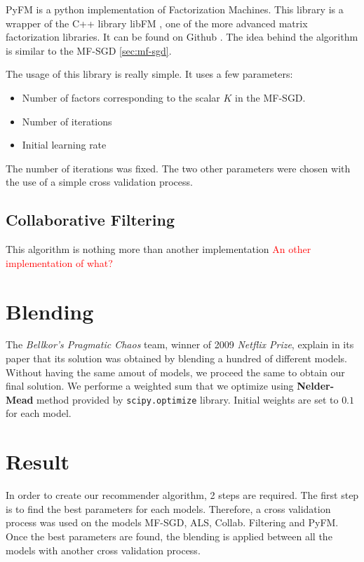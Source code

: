 \documentclass[10pt,conference,compsocconf]{IEEEtran}
\begin{document}
PyFM is a python implementation of Factorization Machines. This library is a wrapper of the C++ library libFM \cite{rendle:tist2012}, one of the more advanced matrix factorization libraries. It can be found on Github \cite{pyfm}. The idea behind the algorithm is similar to the MF-SGD \ref{sec:mf-sgd}. 

The usage of this library is really simple. It uses a few parameters:
\begin{itemize}
 \item Number of factors corresponding to the scalar $K$ in the MF-SGD.
 \item Number of iterations
 \item Initial learning rate
\end{itemize}

The number of iterations was fixed. The two other parameters were chosen with the use of a simple cross validation process.

\subsection{Collaborative Filtering}

This algorithm is nothing more than another implementation \textcolor{red}{An other implementation of what?}

\section{Blending}

The \textit{Bellkor's Pragmatic Chaos} team, winner of 2009 \textit{Netflix Prize}, explain in its paper that its solution was obtained by blending a hundred of different models. \cite{BellKore_netflix} Without having the same amout of models, we proceed the same to obtain our final solution. We performe a weighted sum that we optimize using \textbf{Nelder-Mead} method provided by \texttt{scipy.optimize} library. Initial weights are set to $0.1$ for each model.

\section{Result}

In order to create our recommender algorithm, 2 steps are required. The first step is to find the best parameters for each models. Therefore, a cross validation process was used on the models MF-SGD, ALS, Collab. Filtering and PyFM. Once the best parameters are found, the blending is applied between all the models with another cross validation process. 
\end{document}
